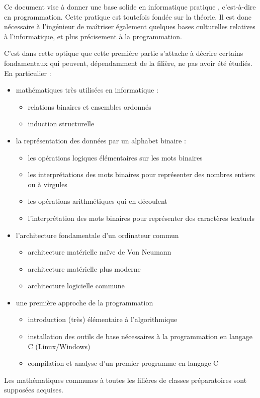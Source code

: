 \documentclass[../../main.tex]{subfiles}
\begin{document}
Ce document vise à donner une base solide en informatique \og pratique \fg{}, c'est-à-dire en programmation.
Cette pratique est toutefois fondée sur la théorie. Il est donc nécessaire à l'ingénieur de maîtriser
également quelques bases culturelles relatives à l'informatique, et plus précisement à la programmation.

C'est dans cette optique que cette première partie s'attache à décrire certains fondamentaux qui
peuvent, dépendamment de la filière, ne pas avoir été étudiés. En particulier :
\begin{itemize}
	\item mathématiques très utilisées en informatique :
	\begin{itemize}
		\item relations binaires et ensembles ordonnés
		\item induction structurelle
	\end{itemize}
	\item la représentation des données par un alphabet binaire :
	\begin{itemize}
		\item les opérations logiques élémentaires sur les mots binaires
		\item les interprétations des mots binaires pour représenter des nombres entiers ou à virgules
		\item les opérations arithmétiques qui en découlent
		\item l'interprétation des mots binaires pour représenter des caractères textuels
	\end{itemize}
	\item l'architecture fondamentale d'un ordinateur commun
	\begin{itemize}
		\item architecture matérielle naïve de Von Neumann
		\item architecture matérielle plus moderne
		\item architecture logicielle commune
	\end{itemize}
	\item une première approche de la programmation
	\begin{itemize}
		\item introduction (très) élémentaire à l'algorithmique
		\item installation des outils de base nécessaires à la programmation en langage C (Linux/Windows)
		\item compilation et analyse d'un premier programme en langage C
	\end{itemize}
\end{itemize}
Les mathématiques communes à toutes les filières de classes préparatoires sont supposées acquises.
\end{document}
